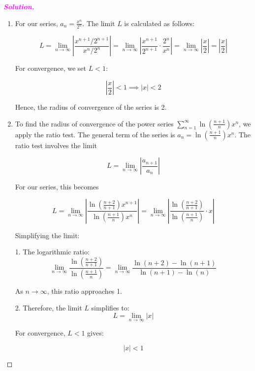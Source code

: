 \documentclass[12pt,openany]{book}
\theoremstyle{definition}
\newcommand{\sol}{\textcolor{magenta}{\bf Solution}}
\begin{document}
	\begin{proof}[\sol]
		\begin{enumerate}[1.]
			\item For our series, \( a_n = \frac{x^n}{2^n} \). The limit \( L \) is calculated as follows:
			
			\[ L = \lim_{n \to \infty} \left| \frac{x^{n+1}/2^{n+1}}{x^n/2^n} \right|  = \lim_{n \to \infty} \left| \frac{x^{n+1}}{2^{n+1}} \cdot \frac{2^n}{x^n} \right|  = \lim_{n \to \infty} \left| \frac{x}{2} \right| = \left| \frac{x}{2} \right| \]
			
			For convergence, we set \( L < 1 \):
			
			\[ \left| \frac{x}{2} \right| < 1 \implies \left| x \right| < 2 \]
			
			Hence, the radius of convergence of the series is 2.
			\item To find the radius of convergence of the power series \(\sum_{n=1}^{\infty} \ln\left(\frac{n+1}{n}\right) x^n\), we apply the ratio test. The general term of the series is \(a_n = \ln\left(\frac{n+1}{n}\right) x^n\). The ratio test involves the limit
			
			\[ L = \lim_{n \to \infty} \left| \frac{a_{n+1}}{a_n} \right| \]
			
			For our series, this becomes
			
			\[ L = \lim_{n \to \infty} \left| \frac{\ln\left(\frac{n+2}{n+1}\right) x^{n+1}}{\ln\left(\frac{n+1}{n}\right) x^n} \right|= \lim_{n \to \infty} \left| \frac{\ln\left(\frac{n+2}{n+1}\right)}{\ln\left(\frac{n+1}{n}\right)} \cdot x \right| \]
			
			Simplifying the limit:
			
			1. The logarithmic ratio:
			\[ \lim_{n \to \infty} \frac{\ln\left(\frac{n+2}{n+1}\right)}{\ln\left(\frac{n+1}{n}\right)} = \lim_{n \to \infty} \frac{\ln(n+2) - \ln(n+1)}{\ln(n+1) - \ln(n)} \]
			
			As \(n \to \infty\), this ratio approaches 1.
			
			2. Therefore, the limit \(L\) simplifies to:
			\[ L = \lim_{n \to \infty} \left| x \right| \]
			
			For convergence, \( L < 1 \) gives:
			
			\[ \left| x \right| < 1 \]
			

\end{enumerate}
\end{proof}
\end{document}
